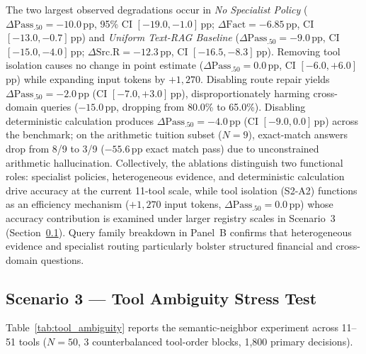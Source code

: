 The two largest observed degradations occur in \emph{No Specialist Policy} ($\Delta\text{Pass}_{.50} = -10.0$\,pp, 95\% CI $[-19.0, -1.0]$\,pp; $\Delta\text{Fact} = -6.85$\,pp, CI $[-13.0, -0.7]$\,pp) and \emph{Uniform Text-RAG Baseline} ($\Delta\text{Pass}_{.50} = -9.0$\,pp, CI $[-15.0, -4.0]$\,pp; $\Delta\text{Src.R} = -12.3$\,pp, CI $[-16.5, -8.3]$\,pp). Removing tool isolation causes no change in point estimate ($\Delta\text{Pass}_{.50} = 0.0$\,pp, CI $[-6.0, +6.0]$\,pp) while expanding input tokens by $+1{,}270$. Disabling route repair yields $\Delta\text{Pass}_{.50} = -2.0$\,pp (CI $[-7.0, +3.0]$\,pp), disproportionately harming cross-domain queries ($-15.0$\,pp, dropping from 80.0\% to 65.0\%). Disabling deterministic calculation produces $\Delta\text{Pass}_{.50} = -4.0$\,pp (CI $[-9.0, 0.0]$\,pp) across the benchmark; on the arithmetic tuition subset ($N{=}9$), exact-match answers drop from 8/9 to 3/9 ($-55.6$\,pp exact match pass) due to unconstrained arithmetic hallucination. Collectively, the ablations distinguish two functional roles: specialist policies, heterogeneous evidence, and deterministic calculation drive accuracy at the current 11-tool scale, while tool isolation (S2-A2) functions as an efficiency mechanism ($+1{,}270$ input tokens, $\Delta\text{Pass}_{.50} = 0.0$\,pp) whose accuracy contribution is examined under larger registry scales in Scenario~3 (Section~\ref{sec:s3_results}). Query family breakdown in Panel~B confirms that heterogeneous evidence and specialist routing particularly bolster structured financial and cross-domain questions.

\subsection{Scenario 3 --- Tool Ambiguity Stress Test}
\label{sec:s3_results}

Table~\ref{tab:tool_ambiguity} reports the semantic-neighbor experiment across 11--51 tools ($N{=}50$, 3 counterbalanced tool-order blocks, 1,800 primary decisions).


